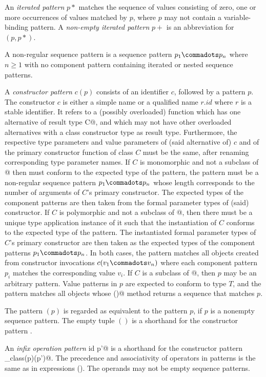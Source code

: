 \documentclass[11pt]{report}
\begin{document}
An {\em iterated pattern} $p*$ matches the sequence of values
consisting of zero, one or more occurrences of values matched by $p$,
where $p$ may not contain a variable-binding pattern. A {\em non-empty
iterated pattern} $p+$ is an abbreviation for $(p,p*)$. 

A non-regular sequence pattern is a sequence pattern $p_1 \commadots p_n$ 
where $n \geq 1$ with no component pattern containing iterated or nested
sequence patterns.

A {\em constructor pattern} $c ( p )$ consists of an identifier $c$,
followed by a pattern $p$.  The constructor $c$ is either a simple
name or a qualified name $r.id$ where $r$ is a stable identifier. It
refers to a (possibly overloaded) function which has one alternative
of result type \verb@class C@, and which may not have other overloaded
alternatives with a class constructor type as result type.
Furthermore, the respective type parameters and value parameters of
(said alternative of) $c$ and of the primary constructor function of
class $C$ must be the same, after renaming corresponding type
parameter names.  If $C$ is monomorphic and not a subclass of
\verb@Seq[ T ]@ then \verb@C@ must conform to the expected type of the
pattern, the pattern must be a non-regular sequence pattern $p_1
\commadots p_n$ whose length corresponds to the number of arguments of
$C$'s primary constructor. The expected types of the component
patterns are then taken from the formal parameter types of (said)
constructor.  If $C$ is polymorphic and not a subclass of
\verb@Seq[ T ]@, then there must be a unique type application instance
of it such that the instantiation of $C$ conforms to the expected type
of the pattern. The instantiated formal parameter types of $C$'s
primary constructor are then taken as the expected types of the
component patterns $p_1\commadots p_n$.  In both cases, the pattern
matches all objects created from constructor invocations
$c(v_1 \commadots v_n)$ where each component pattern $p_i$ matches the
corresponding value $v_i$. If $C$ is a subclass of \verb@Seq[ T ]@,
then $p$ may be an arbitrary pattern. Value patterns in $p$ are
expected to conform to type $T$, and the pattern matches all objects
whose \verb@elements()@ method returns a sequence that matches $p$.

The pattern $(p)$ is regarded as equivalent to the pattern $p$, if $p$
is a nonempty sequence pattern. The empty tuple $()$ is a shorthand
for the constructor pattern \verb@Unit@.

An {\em infix operation pattern} \verb@p id p'@ is a shorthand for the
constructor pattern \verb@id_class(p)(p')@.  The precedence and
associativity of operators in patterns is the same as in expressions
(). The operands may not be empty sequence
patterns.
\end{document}

